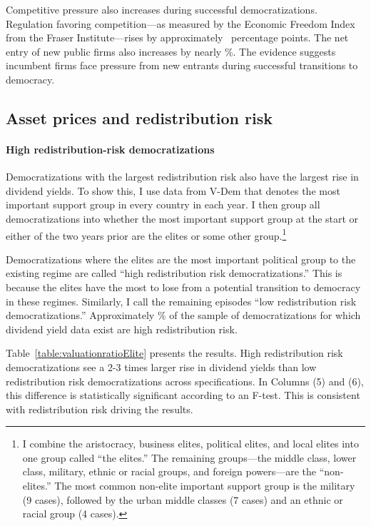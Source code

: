 \documentclass[12pt]{article}
\numberwithin{equation}{section}
\begin{document}
Competitive pressure also increases during successful democratizations. Regulation favoring competition---as measured by the Economic Freedom Index from the Fraser Institute---rises by approximately \tabNineThreeCE\ percentage points. The net entry of new public firms also increases by nearly \tabNineFourCE\%. The evidence suggests incumbent firms face pressure from new entrants during successful transitions to democracy.

\subsection{Asset prices and redistribution risk}\label{section:asset_prices_redist}

\paragraph{High redistribution-risk democratizations}
\label{par:red_risk_beg}
Democratizations with the largest redistribution risk also have the largest rise in dividend yields. To show this, I use data from V-Dem that denotes the most important support group in every country in each year. I then group all democratizations into whether the most important support group at the start or either of the two years prior are the elites or some other group.\footnote{I combine the aristocracy, business elites, political elites, and local elites into one group called ``the elites.'' The remaining groups---the middle class, lower class, military, ethnic or racial groups, and foreign powers---are the ``non-elites.'' The most common non-elite important support group is the military (9 cases), followed by the urban middle classes (7 cases) and an ethnic or racial group (4 cases).} 

Democratizations where the elites are the most important political group to the existing regime are called ``high redistribution risk democratizations.'' This is because the elites have the most to lose from a potential transition to democracy in these regimes. Similarly, I call the remaining episodes ``low redistribution risk democratizations.'' Approximately \pctHighRedistRisk\% of the sample of democratizations for which dividend yield data exist are high redistribution risk.

Table~\ref{table:valuationratioElite} presents the results. High redistribution risk democratizations see a 2-3 times larger rise in dividend yields than low redistribution risk democratizations across specifications. In Columns (5) and (6), this difference is statistically significant according to an F-test. This is consistent with redistribution risk driving the results.
\end{document}
